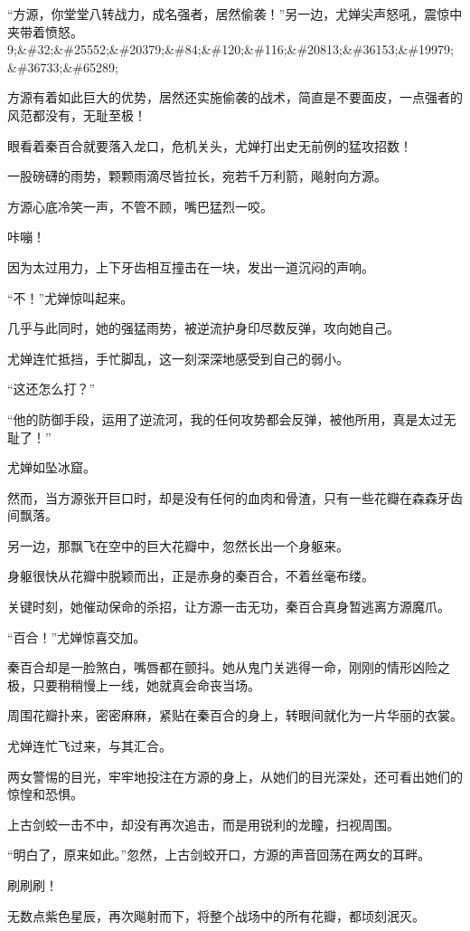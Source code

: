 \begin{this_body}
“方源，你堂堂八转战力，成名强者，居然偷袭！”另一边，尤婵尖声怒吼，震惊中夹带着愤怒。9;\&\#32;\&\#25552;\&\#20379;\&\#84;\&\#120;\&\#116;\&\#20813;\&\#36153;\&\#19979;\&\#36733;\&\#65289;

方源有着如此巨大的优势，居然还实施偷袭的战术，简直是不要面皮，一点强者的风范都没有，无耻至极！

眼看着秦百合就要落入龙口，危机关头，尤婵打出史无前例的猛攻招数！

一股磅礴的雨势，颗颗雨滴尽皆拉长，宛若千万利箭，飚射向方源。

方源心底冷笑一声，不管不顾，嘴巴猛烈一咬。

咔嘣！

因为太过用力，上下牙齿相互撞击在一块，发出一道沉闷的声响。

“不！”尤婵惊叫起来。

几乎与此同时，她的强猛雨势，被逆流护身印尽数反弹，攻向她自己。

尤婵连忙抵挡，手忙脚乱，这一刻深深地感受到自己的弱小。

“这还怎么打？”

“他的防御手段，运用了逆流河，我的任何攻势都会反弹，被他所用，真是太过无耻了！”

尤婵如坠冰窟。

然而，当方源张开巨口时，却是没有任何的血肉和骨渣，只有一些花瓣在森森牙齿间飘落。

另一边，那飘飞在空中的巨大花瓣中，忽然长出一个身躯来。

身躯很快从花瓣中脱颖而出，正是赤身的秦百合，不着丝毫布缕。

关键时刻，她催动保命的杀招，让方源一击无功，秦百合真身暂逃离方源魔爪。

“百合！”尤婵惊喜交加。

秦百合却是一脸煞白，嘴唇都在颤抖。她从鬼门关逃得一命，刚刚的情形凶险之极，只要稍稍慢上一线，她就真会命丧当场。

周围花瓣扑来，密密麻麻，紧贴在秦百合的身上，转眼间就化为一片华丽的衣裳。

尤婵连忙飞过来，与其汇合。

两女警惕的目光，牢牢地投注在方源的身上，从她们的目光深处，还可看出她们的惊惶和恐惧。

上古剑蛟一击不中，却没有再次追击，而是用锐利的龙瞳，扫视周围。

“明白了，原来如此。”忽然，上古剑蛟开口，方源的声音回荡在两女的耳畔。

刷刷刷！

无数点紫色星辰，再次飚射而下，将整个战场中的所有花瓣，都顷刻泯灭。


\end{this_body}

